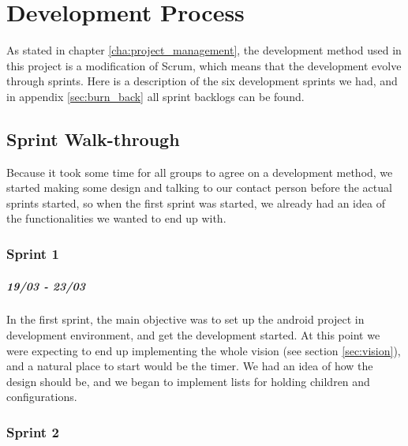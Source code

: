 \chapter{Development Process}
As stated in chapter \ref{cha:project_management}, the development method used in this project is a modification of Scrum, which means that the development evolve through sprints. Here is a description of the six development sprints we had, and in appendix \ref{sec:burn_back} all sprint backlogs can be found.

\section{Sprint Walk-through}
Because it took some time for all groups to agree on a development method, we started making some design and talking to our contact person before the actual sprints started, so when the first sprint was started, we already had an idea of the functionalities we wanted to end up with.

\subsection*{Sprint 1}
\paragraph{19/03 - 23/03}
In the first sprint, the main objective was to set up the android project in development environment, and get the development started. At this point we were expecting to end up implementing the whole vision (see section \ref{sec:vision}), and a natural place to start would be the timer. We had an idea of how the design should be, and we began to implement lists for holding children and configurations.

\subsection*{Sprint 2}
